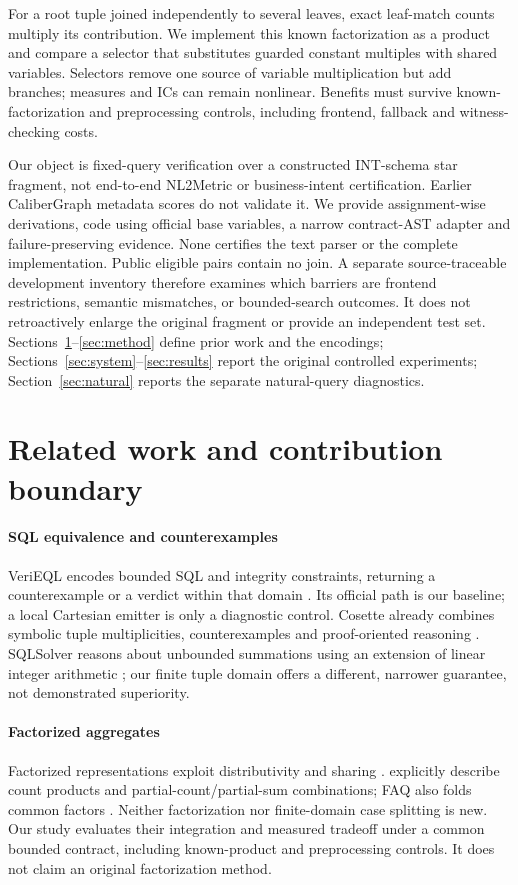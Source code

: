\documentclass[3p,times,authoryear]{elsarticle}
\begin{document}
For a root tuple joined independently to several leaves, exact leaf-match counts multiply its contribution. We implement this known factorization as a product and compare a selector that substitutes guarded constant multiples with shared variables. Selectors remove one source of variable multiplication but add branches; measures and ICs can remain nonlinear. Benefits must survive known-factorization and preprocessing controls, including frontend, fallback and witness-checking costs.

Our object is fixed-query verification over a constructed INT-schema star fragment, not end-to-end NL2Metric or business-intent certification. Earlier CaliberGraph metadata scores do not validate it. We provide assignment-wise derivations, code using official base variables, a narrow contract-AST adapter and failure-preserving evidence. None certifies the text parser or the complete implementation. Public eligible pairs contain no join. A separate source-traceable development inventory therefore examines which barriers are frontend restrictions, semantic mismatches, or bounded-search outcomes. It does not retroactively enlarge the original fragment or provide an independent test set. Sections~\ref{sec:related}--\ref{sec:method} define prior work and the encodings; Sections~\ref{sec:system}--\ref{sec:results} report the original controlled experiments; Section~\ref{sec:natural} reports the separate natural-query diagnostics.

\section{Related work and contribution boundary}\label{sec:related}
\paragraph{SQL equivalence and counterexamples}
VeriEQL encodes bounded SQL and integrity constraints, returning a counterexample or a verdict within that domain \citep{he2024verieql}. Its official path is our baseline; a local Cartesian emitter is only a diagnostic control. Cosette already combines symbolic tuple multiplicities, counterexamples and proof-oriented reasoning \citep{chu2017cosette}. SQLSolver reasons about unbounded summations using an extension of linear integer arithmetic \citep{ding2023sqlsolver}; our finite tuple domain offers a different, narrower guarantee, not demonstrated superiority.

\paragraph{Factorized aggregates}
Factorized representations exploit distributivity and sharing \citep{olteanu2016factorized}. \citet{bakibayev2013aggregation} explicitly describe count products and partial-count/partial-sum combinations; FAQ also folds common factors \citep{abo2023faq}. Neither factorization nor finite-domain case splitting is new. Our study evaluates their integration and measured tradeoff under a common bounded contract, including known-product and preprocessing controls. It does not claim an original factorization method.
\end{document}
